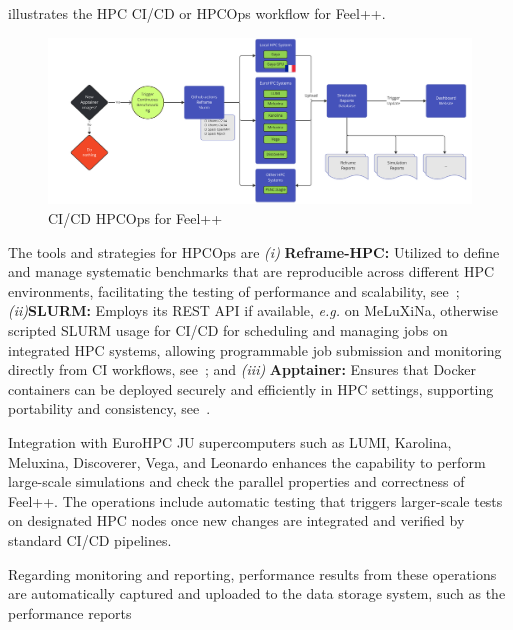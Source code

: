 \documentclass[runningheads]{llncs}
\begin{document}
 illustrates the HPC CI/CD or HPCOps workflow for Feel++.
\begin{figure}
    \centering
    \includegraphics[width=\textwidth]{img-feelpp-hpcops.pdf}
    \caption{CI/CD HPCOps for Feel++}
    \label{fig:feelpp-hpcops}
\end{figure}

The tools and strategies for HPCOps are  \textit{(i) }\textbf{Reframe-HPC:} Utilized to define and manage systematic benchmarks that are reproducible across different HPC environments, facilitating the testing of performance and scalability, see~\cite{karakasis_reframe-hpcreframe_2024};
\textit{(ii)}\textbf{SLURM:} Employs its REST API if available, \textit{e.g.} on MeLuXiNa, otherwise scripted SLURM usage for CI/CD for scheduling and managing jobs on integrated HPC systems, allowing programmable job submission and monitoring directly from CI workflows, see~\cite{slurm_development_team_slurm_2024}; and \textit{(iii)} \textbf{Apptainer:} Ensures that Docker containers can be deployed securely and efficiently in HPC settings, supporting portability and consistency, see~\cite{apptainer_contributors_apptainer_2024}.

Integration with EuroHPC JU supercomputers such as LUMI, Karolina, Meluxina, Discoverer, Vega, and Leonardo enhances the capability to perform large-scale simulations and check the parallel properties and correctness of Feel++. 
The operations include automatic testing that triggers larger-scale tests on designated HPC nodes once new changes are integrated and verified by standard CI/CD pipelines.

Regarding monitoring and reporting, performance results from these operations are automatically captured and uploaded to the data storage system, such as the performance reports
\end{document}
